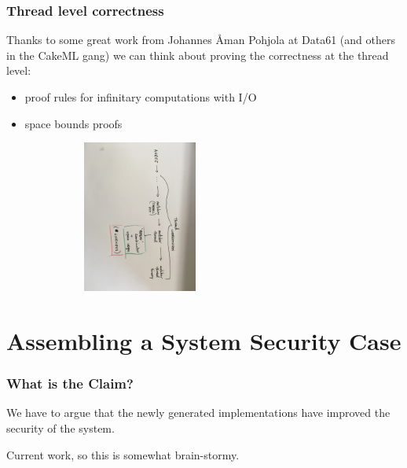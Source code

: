 \documentclass{beamer}
\begin{document}
\begin{frame}[fragile]\frametitle{Thread level correctness}

Thanks to some great work from Johannes {\AA}man Pohjola at Data61
(and others in the CakeML gang) we can think about proving the
correctness at the thread level:

\begin{itemize}
\item proof rules for infinitary computations with I/O
\item space bounds proofs
\end{itemize}

\includegraphics[width=90mm,height=50mm]{thread.jpg}

\end{frame}

\section {Assembling a System Security Case}

\begin{frame}\frametitle{What is the Claim?}

 We have to argue that the newly generated implementations have
 improved the security of the system.

 Current work, so this is somewhat brain-stormy.

\end{frame}
\end{document}
